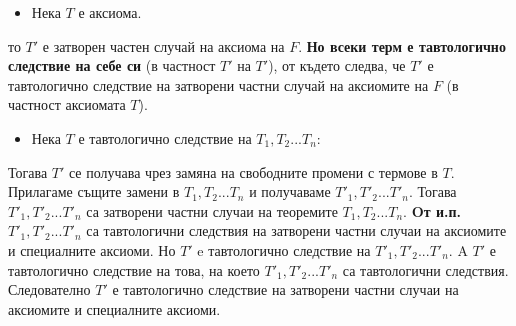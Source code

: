 \documentclass[french]{article}
\begin{document}
\begin{itemize}
\item Нека $T$ е аксиома.
\end{itemize}
 то $T'$ е затворен частен случай на аксиома на $F$. \newline \textbf{Но всеки терм е тавтологично следствие на себе си} (в частност $T'$ на $T'$), от където следва, че $T'$ е тавтологично следствие на затворени частни случай на аксиомите на $F$ (в частност аксиомата $T$).
 \begin{itemize}
\item Нека $T$ е тавтологично следствие на $T_1, T_2 ... T_n$:
\end{itemize}
Тогава $T'$ се получава чрез замяна на свободните промени с термове в $T$. Прилагаме същите замени в $T_1, T_2 ... T_n$ и получаваме  $T'_1, T'_2 ... T'_n$. Тогава $T'_1, T'_2 ... T'_n$ са затворени частни случаи на теоремите $T_1, T_2 ... T_n$. \newline \textbf{Oт и.п.} $T'_1, T'_2 ... T'_n$ са тавтологични следствия на затворени частни случаи на аксиомите и специалните аксиоми. Но $T'$ e тавтологично следствие на $T'_1, T'_2 ... T'_n$. A  $T'$ е тавтологично следствие на това, на което $T'_1, T'_2 ... T'_n$ са тавтологични следствия. \newline Следователно $T'$ е тавтологично следствие на затворени частни случаи на аксиомите и специалните аксиоми. 
\end{document}
